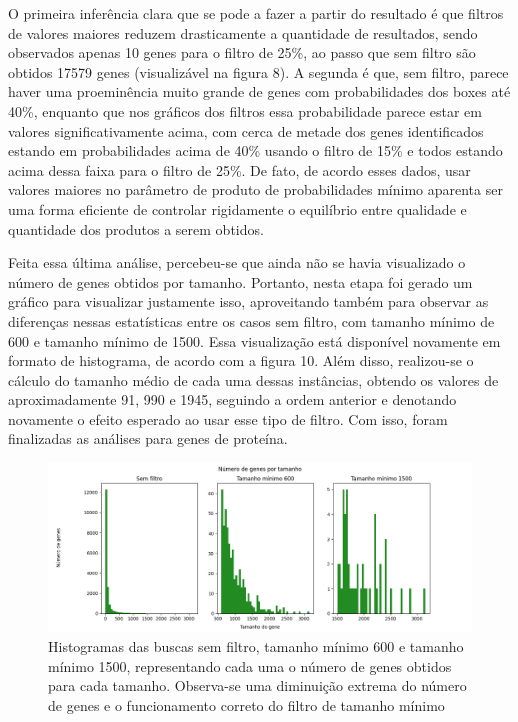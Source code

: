 \documentclass[brazilian,12pt,a4paper,final]{article}
\begin{document}
	 \vspace{0.5cm}
	
	O primeira inferência clara que se pode a fazer a partir do resultado é que filtros de valores maiores reduzem drasticamente a quantidade de resultados, sendo observados apenas 10 genes para o filtro de 25\%, ao passo que sem filtro são obtidos 17579 genes (visualizável na figura 8). A segunda é que, sem filtro, parece haver uma proeminência muito grande de genes com probabilidades dos boxes até 40\%, enquanto que nos gráficos dos filtros essa probabilidade parece estar em valores significativamente acima, com cerca de metade dos genes identificados estando em probabilidades acima de 40\% usando o filtro de 15\% e todos estando acima dessa faixa para o filtro de 25\%. De fato, de acordo esses dados, usar valores maiores no parâmetro de produto de probabilidades mínimo aparenta ser uma forma eficiente de controlar rigidamente o equilíbrio entre qualidade e quantidade dos produtos a serem obtidos.
	
	 \vspace{0.5cm}
	
	Feita essa última análise, percebeu-se que ainda não se havia visualizado o número de genes obtidos por tamanho. Portanto, nesta etapa foi gerado um gráfico para visualizar justamente isso, aproveitando também para observar as diferenças nessas estatísticas entre os casos sem filtro, com tamanho mínimo de 600 e tamanho mínimo de 1500. Essa visualização está disponível novamente em formato de histograma, de acordo com a figura 10. Além disso, realizou-se o cálculo do tamanho médio de cada uma dessas instâncias, obtendo os valores de aproximadamente 91, 990 e 1945, seguindo a ordem anterior e denotando novamente o efeito esperado ao usar esse tipo de filtro. Com isso, foram finalizadas as análises para genes de proteína.
	
	\begin{figure}[hbtp]
		\begin{center}
			\includegraphics[width=15cm]{../Figures/GenesPerSize.png}
			\caption{Histogramas das buscas sem filtro, tamanho mínimo 600 e tamanho mínimo 1500, representando cada uma o número de genes obtidos para cada tamanho. Observa-se uma diminuição extrema do número de genes e o funcionamento correto do filtro de tamanho mínimo}
			\label{fig}
		\end{center}
	\end{figure}
	
\end{document}
